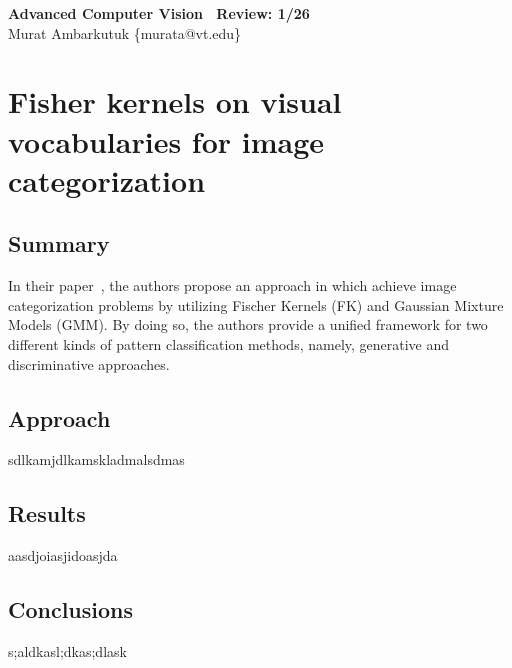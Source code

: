 \documentclass[11pt]{article}
\begin{document}
\thispagestyle{empty}
\begin{center}
	\textbf{\huge{Advanced Computer Vision \textemdash~Review: 1/26}} \\
	\bigskip
	\large{Murat Ambarkutuk \{murata@vt.edu\}}
\end{center}
\section{Fisher kernels on visual vocabularies for image categorization}
\subsection{Summary}
In their paper~\cite{perronnin2007fisher}, the authors propose an approach in which achieve image categorization problems by utilizing Fischer Kernels (FK) and Gaussian Mixture Models (GMM).
By doing so, the authors provide a unified framework for two different kinds of pattern classification methods, namely, generative and discriminative approaches.

\subsection{Approach}
sdlkamjdlkamskladmalsdmas

\subsection{Results}
aasdjoiasjidoasjda

\subsection{Conclusions}
s;aldkasl;dkas;dlask



\end{document}
